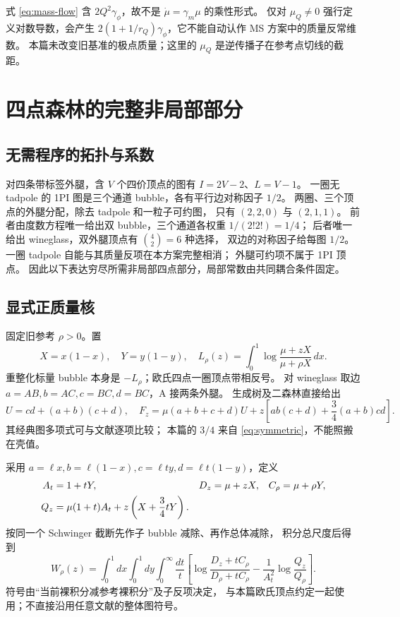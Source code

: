 \documentclass[11pt,a4paper]{ctexart}
\theoremstyle{cnplain}
\theoremstyle{remark}\newtheorem{remark}[theorem]{注}
\newcommand{\gphi}{\gamma_\phi}
\begin{document}
式 \eqref{eq:mass-flow} 含 $2Q^2\gphi$，故不是
$\dot\mu=\gamma_m\mu$ 的乘性形式。
仅对 $\mu_Q\ne0$ 强行定义对数导数，会产生
$2(1+1/r_Q)\gphi$，它不能自动认作 MS 方案中的质量反常维数。
本篇未改变旧基准的极点质量；这里的 $\mu_Q$ 是逆传播子在参考点切线的截距。

\section{四点森林的完整非局部部分}\label{sec:forests}
\subsection{无需程序的拓扑与系数}
对四条带标签外腿，含 $V$ 个四价顶点的图有
$I=2V-2$、$L=V-1$。
一圈无 tadpole 的 1PI 图是三个通道 bubble，各有平行边对称因子 $1/2$。
两圈、三个顶点的外腿分配，除去 tadpole 和一粒子可约图，
只有 $(2,2,0)$ 与 $(2,1,1)$。
前者由度数方程唯一给出双 bubble，三个通道各权重 $1/(2!2!)=1/4$；
后者唯一给出 wineglass，双外腿顶点有 $\binom42=6$ 种选择，
双边的对称因子给每图 $1/2$。
一圈 tadpole 自能与其质量反项在本方案完整相消；
外腿可约项不属于 1PI 顶点。
因此以下表达穷尽所需非局部四点部分，局部常数由共同耦合条件固定。

\subsection{显式正质量核}
固定旧参考 $\rho>0$。置
\begin{equation}\label{eq:one-loop}
 X=x(1-x),\quad Y=y(1-y),\quad
 L_\rho(z)=\int_0^1\log\frac{\mu+zX}{\mu+\rho X}\,dx.
\end{equation}
重整化标量 bubble 本身是 $-L_\rho$；欧氏四点一圈顶点带相反号。
对 wineglass 取边 $a=AB,b=AC,c=BC,d=BC$，A 接两条外腿。
生成树及二森林直接给出
\begin{equation}\label{eq:wine-polynomial}
 U=cd+(a+b)(c+d),\quad
 F_z=\mu(a+b+c+d)U
       +z\left[ab(c+d)+\frac34(a+b)cd\right].
\end{equation}
其经典图多项式可与文献\cite[第5节]{BK}逐项比较；
本篇的 $3/4$ 来自 \eqref{eq:symmetric}，不能照搬在壳值。

采用 $a=\ell x,b=\ell(1-x),c=\ell t y,d=\ell t(1-y)$，定义
\begin{align}
 A_t&=1+tY,& D_z&=\mu+zX,& C_\rho&=\mu+\rho Y, \notag\\
 Q_z&=\mu(1+t)A_t+z\left(X+\frac34tY\right).
                                                        \label{eq:Q}
\end{align}
按同一个 Schwinger 截断先作子 bubble 减除、再作总体减除，
积分总尺度后得到
\begin{equation}\label{eq:W}
 W_\rho(z)=\int_0^1dx\int_0^1dy\int_0^\infty\frac{dt}{t}
 \left[
  \log\frac{D_z+tC_\rho}{D_\rho+tC_\rho}
  -\frac1{A_t^2}\log\frac{Q_z}{Q_\rho}
 \right].
\end{equation}
符号由“当前裸积分减参考裸积分”及子反项决定，
与本篇欧氏顶点约定一起使用；不直接沿用任意文献的整体图符号。
\end{document}

